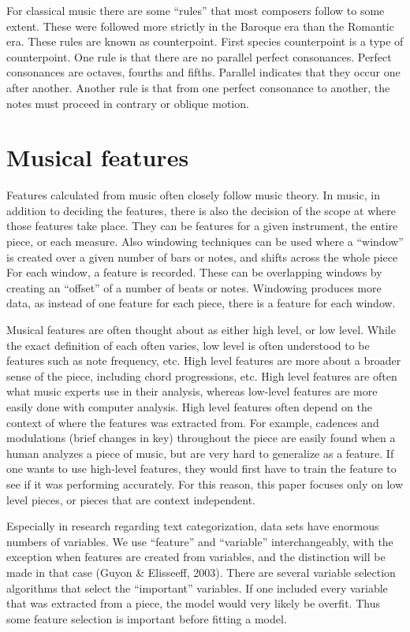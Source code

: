 \documentclass[12pt,twoside]{reedthesis}
\theoremstyle{definition}
\theoremstyle{definition}
\theoremstyle{definition}
\theoremstyle{remark}
\begin{document}
For classical music there are some ``rules'' that most composers follow
to some extent. These were followed more strictly in the Baroque era
than the Romantic era. These rules are known as counterpoint. First
species counterpoint is a type of counterpoint. One rule is that there
are no parallel perfect consonances. Perfect consonances are octaves,
fourths and fifths. Parallel indicates that they occur one after
another. Another rule is that from one perfect consonance to another,
the notes must proceed in contrary or oblique motion.

\section{Musical features}\label{musical-features}

Features calculated from music often closely follow music theory. In
music, in addition to deciding the features, there is also the decision
of the scope at where those features take place. They can be features
for a given instrument, the entire piece, or each measure. Also
windowing techniques can be used where a ``window'' is created over a
given number of bars or notes, and shifts across the whole piece For
each window, a feature is recorded. These can be overlapping windows by
creating an ``offset'' of a number of beats or notes. Windowing produces
more data, as instead of one feature for each piece, there is a feature
for each window.

Musical features are often thought about as either high level, or low
level. While the exact definition of each often varies, low level is
often understood to be features such as note frequency, etc. High level
features are more about a broader sense of the piece, including chord
progressions, etc. High level features are often what music experts use
in their analysis, whereas low-level features are more easily done with
computer analysis. High level features often depend on the context of
where the features was extracted from. For example, cadences and
modulations (brief changes in key) throughout the piece are easily found
when a human analyzes a piece of music, but are very hard to generalize
as a feature. If one wants to use high-level features, they would first
have to train the feature to see if it was performing accurately. For
this reason, this paper focuses only on low level pieces, or pieces that
are context independent.

Especially in research regarding text categorization, data sets have
enormous numbers of variables. We use ``feature'' and ``variable''
interchangeably, with the exception when features are created from
variables, and the distinction will be made in that case (Guyon \&
Elisseeff, 2003). There are several variable selection algorithms that
select the ``important'' variables. If one included every variable that
was extracted from a piece, the model would very likely be overfit. Thus
some feature selection is important before fitting a model.
\end{document}
